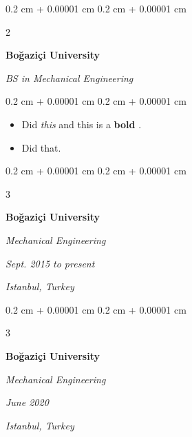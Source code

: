 \documentclass[10pt, letterpaper]{article}
\newenvironment{highlights}{
    \begin{itemize}[
        topsep=0.10 cm,
        parsep=0.10 cm,
        partopsep=0pt,
        itemsep=0pt,
        leftmargin=0.4 cm + 10pt + 0.6 cm
    ]
}{
    \end{itemize}
} %
\newenvironment{onecolentry}{
    \begin{adjustwidth}{
        0.2 cm + 0.00001 cm
    }{
        0.2 cm + 0.00001 cm
    }
}{
    \end{adjustwidth}
} %
\newenvironment{onecolentrybulleted}{
    \onecolentry
    \setcolumnwidth{0.6 cm, \fill}
    \begin{paracol}{2}
    \vspace*{\fill}
    \textbullet
    \vspace*{3px}
    \vspace*{\fill}
    \switchcolumn
}{
    \end{paracol}
    \endonecolentry
} %
\newenvironment{threecolentry}[3][]{
    \onecolentry
    \def\thirdColumn{#3}
    \setcolumnwidth{0.6 cm, \fill, 4.5 cm}
    \begin{paracol}{3}
    #2 \switchcolumn
}{
    \switchcolumn \raggedleft \thirdColumn
    \end{paracol}
    \endonecolentry
} %
\let\hrefWithoutArrow\href
\renewcommand{\href}[2]{\hrefWithoutArrow{#1}{\mbox{\ifthenelse{\equal{#2}{}}{ }{#2 }\raisebox{.15ex}{\footnotesize \faExternalLink*}}}}
\begin{document}
        \vspace{0.2 cm}

        \begin{onecolentrybulleted}
            \textbf{Boğaziçi University}

            \textit{BS in Mechanical Engineering}
        \end{onecolentrybulleted}

        \vspace{0.10 cm}
        \begin{onecolentry}
            \begin{highlights}
                \item Did \textit{this} and this is a \textbf{bold} \href{https://example.com}{link}.
                \item Did that.
            \end{highlights}
        \end{onecolentry}


        \vspace{0.2 cm}

        \begin{threecolentry}{
            \vspace*{\fill}
            \textbullet
            \vspace*{3px}
            \vspace*{\fill}
        }{
        \textit{Sept. 2015 to present}
            
        \textit{Istanbul, Turkey}}
            \textbf{Boğaziçi University}

            \textit{Mechanical Engineering}
        \end{threecolentry}



        \vspace{0.2 cm}

        \begin{threecolentry}{
            \vspace*{\fill}
            \textbullet
            \vspace*{3px}
            \vspace*{\fill}
        }{
        \textit{June 2020}
            
        \textit{Istanbul, Turkey}}
            \textbf{Boğaziçi University}

            \textit{Mechanical Engineering}
        \end{threecolentry}
\end{document}
